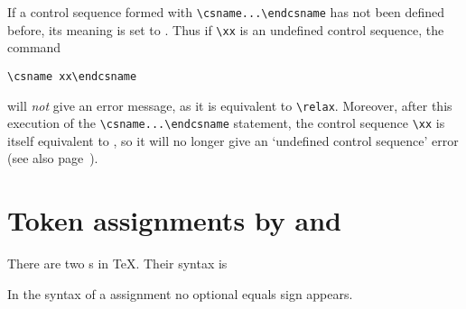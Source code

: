 If a control sequence formed with \verb>\csname...\endcsname>
has not been defined
before, its meaning is set to .
Thus if \verb=\xx= is an undefined control sequence, the
command
\begin{verbatim}
\csname xx\endcsname
\end{verbatim}
will {\em not\/}
give an error message, as it is equivalent to \verb=\relax=.
Moreover, after this execution of the
\verb-\csname...\endcsname- statement, the control sequence
\verb=\xx= is itself equivalent to , so it
will no longer give an `undefined control sequence' error
(see also page~\pageref{relax:cs}).


\section{Token assignments by \protect{} and \protect{}}

There are two s in \TeX.
Their syntax is
\begin{disp}%
     \nl
     \end{disp}
In the syntax of a  assignment
no optional equals sign appears.

